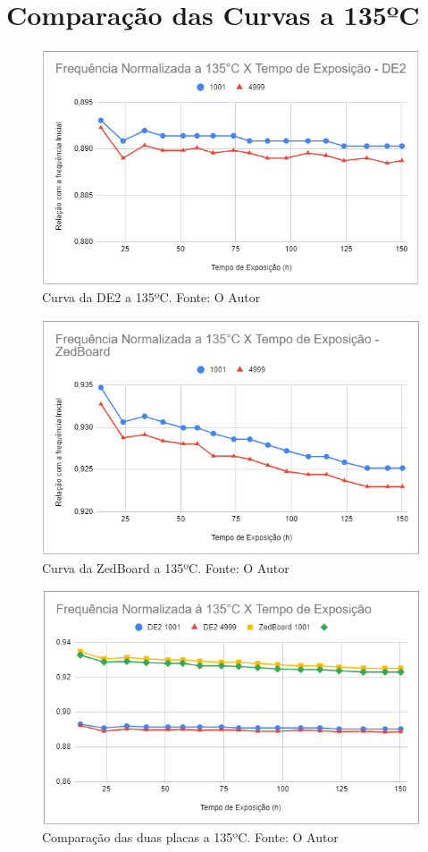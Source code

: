\section{Comparação das Curvas a 135ºC}

\begin{figure}[H]
    \centering
    \includegraphics[scale=0.75]{figures/Resultados/T135DE2}
    \caption{Curva da DE2 a 135ºC. Fonte: O Autor}
    \label{fig:T135DE2}
\end{figure}

\begin{figure}[H]
    \centering
    \includegraphics[scale=0.75]{figures/Resultados/T135ZedBoard}
    \caption{Curva da ZedBoard a 135ºC. Fonte: O Autor}
    \label{fig:T135ZedBoard}
\end{figure}

\begin{figure}[H]
    \centering
    \includegraphics[scale=0.75]{figures/Resultados/T135Ambas}
    \caption{Comparação das duas placas a 135ºC. Fonte: O Autor}
    \label{fig:T135Ambas}
\end{figure}